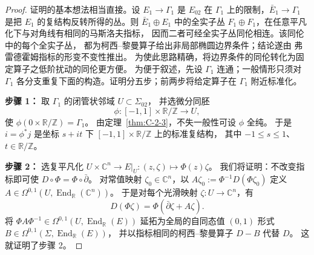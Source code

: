 \begin{proof}
证明的基本想法相当直接。设 $E_1\to\Gamma_1$ 是 $E_{02}$
在 $\Gamma_1$ 上的限制，$\bar E_1\to\Gamma_1$ 是把 $E_1$
的复结构反转所得的丛。则 $\bar E_1\oplus E_1$ 中的全实子丛
$F_1\oplus F_1$，在任意平凡化下与对角线有相同的马斯洛夫指标，
因而二者可经全实子丛同伦相连。该同伦中的每个全实子丛，
都为柯西--黎曼算子给出非局部椭圆边界条件；结论遂由
弗雷德霍姆指标的形变不变性推出。
为使此思路精确，将边界条件的同伦转化为固定算子之低阶扰动的同伦更方便。
为便于叙述，先设 $\Gamma_1$ 连通；一般情形只须对 $\Gamma_1$
各分支重复下面的构造。证明分五步；前两步将给定算子在 $\Gamma_1$ 附近标准化。

\noindent\textbf{步骤 1：} 取 $\Gamma_1$ 的闭管状邻域 $U\subset\Sigma_{02}$，
并选微分同胚
\[
  \phi:[-1,1]\times\mathbb R/\mathbb Z\longrightarrow U,
\]
使 $\phi(0\times\mathbb R/\mathbb Z)=\Gamma_1$。
由定理~\ref{thm:C-2-3}，不失一般性可设 $\phi$ 全纯。
于是 $i=\phi^*j$ 是坐标 $s+it$ 下
$[-1,1]\times\mathbb R/\mathbb Z$ 上的标准复结构，
其中 $-1\le s\le1$、$t\in\mathbb R/\mathbb Z$。

\noindent\textbf{步骤 2：} 选复平凡化
$U\times\mathbb C^n\to E|_U:(z,\zeta)\mapsto\Phi(z)\zeta$。
我们将证明：不改变指标即可使 $D\circ\Phi=\Phi\circ\bar\partial$。
对常值映射 $\zeta_0\in\mathbb C^n$，以
$A\zeta_0:=\Phi^{-1}D(\Phi\zeta_0)$ 定义
$A\in\Omega^{0,1}(U,\operatorname{End}_{\mathbb R}(\mathbb C^n))$。
于是对每个光滑映射 $\zeta:U\to\mathbb C^n$，有
\[
  D(\Phi\zeta)=\Phi(\bar\partial\zeta+A\zeta).
\]
将 $\Phi A\Phi^{-1}\in\Omega^{0,1}(U,\operatorname{End}_{\mathbb R}(E))$
延拓为全局的自同态值 $(0,1)$ 形式
$B\in\Omega^{0,1}(\Sigma,\operatorname{End}_{\mathbb R}(E))$，
并以指标相同的柯西--黎曼算子 $D-B$ 代替 $D$。
这就证明了步骤 2。


\end{proof}
